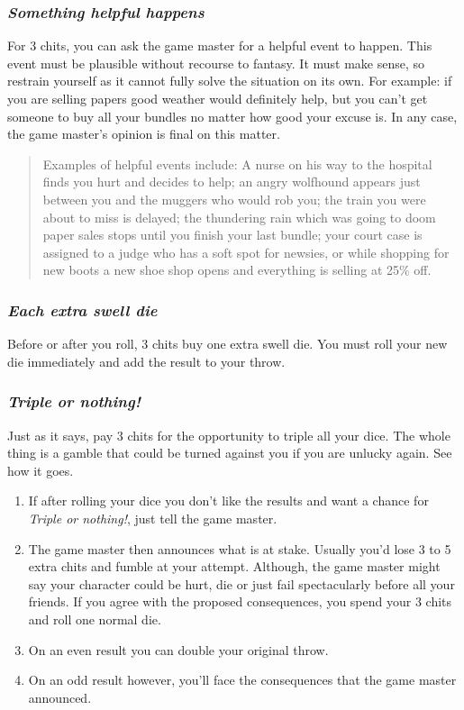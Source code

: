 \subsubsection*{\emph{Something helpful happens}}

For 3 chits, you can ask the game master for a helpful event to happen.
This event must be plausible without recourse to fantasy. It must
make sense, so restrain yourself as it cannot fully solve the situation
on its own. For example: if you are selling papers good weather would
definitely help, but you can't get someone to buy all your bundles
no matter how good your excuse is. In any case, the game master's
opinion is final on this matter.
\begin{quote}
Examples of helpful events include: A nurse on his way to the hospital
finds you hurt and decides to help; an angry wolfhound appears just
between you and the muggers who would rob you; the train you were
about to miss is delayed; the thundering rain which was going to doom
paper sales stops until you finish your last bundle; your court case
is assigned to a judge who has a soft spot for newsies, or while shopping
for new boots a new shoe shop opens and everything is selling at 25\%
off. 
\end{quote}

\subsubsection*{\emph{Each extra swell die}}

Before or after you roll, 3 chits buy one extra swell die. You must
roll your new die immediately and add the result to your throw. 


\subsubsection*{\emph{Triple or nothing!}}

Just as it says, pay 3 chits for the opportunity to triple all your
dice. The whole thing is a gamble that could be turned against you
if you are unlucky again. See how it goes.
\begin{enumerate}
\item If after rolling your dice you don't like the results and want a chance
for \emph{Triple or nothing!}, just tell the game master.
\item The game master then announces what is at stake. Usually you'd lose
3 to 5 extra chits and fumble at your attempt. Although, the game
master might say your character could be hurt, die or just fail spectacularly
before all your friends. If you agree with the proposed consequences,
you spend your 3 chits and roll one normal die. 
\item On an even result you can double your original throw. 
\item On an odd result however, you'll face the consequences that the game
master announced.
\end{enumerate}

